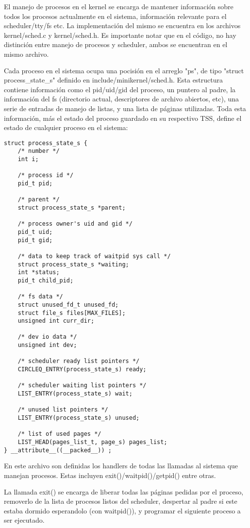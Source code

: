 El manejo de procesos en el kernel se encarga de mantener información sobre
todos los procesos actualmente en el sistema, información relevante para el
scheduler/tty/fs etc. La implementación del mismo se encuentra en los archivos
kernel/sched.c y kernel/sched.h. Es importante notar que en el código, no hay
distinción entre manejo de procesos y scheduler, ambos se encuentran en el
mismo archivo.

Cada proceso en el sistema ocupa una pocisión en el arreglo "ps", de tipo
"struct process\_state\_s" definido en include/minikernel/sched.h. Esta
estructura contiene información como el pid/uid/gid del proceso, un puntero al
padre, la información del fs (directorio actual, descriptores de archivo
abiertos, etc), una serie de entradas de manejo de listas, y una lista de
páginas utilizadas. Toda esta información, más el estado del proceso guardado
en su respectivo TSS, define el estado de cualquier proceso en el sistema:

\begin{verbatim}
struct process_state_s {
    /* number */
    int i;

    /* process id */
    pid_t pid;

    /* parent */
    struct process_state_s *parent;

    /* process owner's uid and gid */
    pid_t uid;
    pid_t gid;

    /* data to keep track of waitpid sys call */
    struct process_state_s *waiting;
    int *status;
    pid_t child_pid;

    /* fs data */
    struct unused_fd_t unused_fd;
    struct file_s files[MAX_FILES];
    unsigned int curr_dir;

    /* dev io data */
    unsigned int dev;

    /* scheduler ready list pointers */
    CIRCLEQ_ENTRY(process_state_s) ready;

    /* scheduler waiting list pointers */
    LIST_ENTRY(process_state_s) wait;

    /* unused list pointers */
    LIST_ENTRY(process_state_s) unused;

    /* list of used pages */
    LIST_HEAD(pages_list_t, page_s) pages_list;
} __attribute__((__packed__)) ;
\end{verbatim}

En este archivo son definidas los handlers de todas las llamadas al sistema
que manejan procesos. Estas incluyen exit()/waitpid()/getpid() entre otras.

La llamada exit() se encarga de liberar todas las páginas pedidas por el
proceso, removerlo de la lista de procesos listos del scheduler, despertar al
padre si este estaba dormido esperandolo (con waitpid()), y programar el
siguiente proceso a ser ejecutado.

